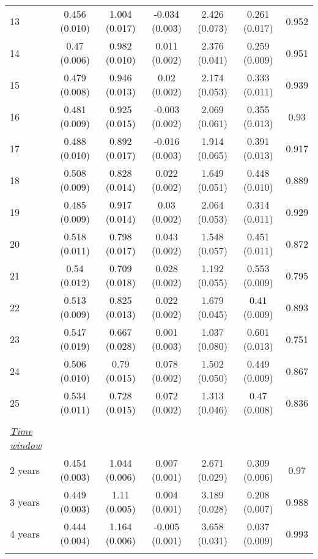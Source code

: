 \begin{tabular}{@{\extracolsep{5pt}} l cccccc}
13 & 0.456 (0.010) & 1.004 (0.017) & -0.034 (0.003) & 2.426 (0.073) & 0.261 (0.017) & 0.952 \\ 
14 & 0.47 (0.006) & 0.982 (0.010) & 0.011 (0.002) & 2.376 (0.041) & 0.259 (0.009) & 0.951 \\ 
15 & 0.479 (0.008) & 0.946 (0.013) & 0.02 (0.002) & 2.174 (0.053) & 0.333 (0.011) & 0.939 \\ 
16 & 0.481 (0.009) & 0.925 (0.015) & -0.003 (0.002) & 2.069 (0.061) & 0.355 (0.013) & 0.93 \\ 
17 & 0.488 (0.010) & 0.892 (0.017) & -0.016 (0.003) & 1.914 (0.065) & 0.391 (0.013) & 0.917 \\ 
18 & 0.508 (0.009) & 0.828 (0.014) & 0.022 (0.002) & 1.649 (0.051) & 0.448 (0.010) & 0.889 \\ 
19 & 0.485 (0.009) & 0.917 (0.014) & 0.03 (0.002) & 2.064 (0.053) & 0.314 (0.011) & 0.929 \\ 
20 & 0.518 (0.011) & 0.798 (0.017) & 0.043 (0.002) & 1.548 (0.057) & 0.451 (0.011) & 0.872 \\ 
21 & 0.54 (0.012) & 0.709 (0.018) & 0.028 (0.002) & 1.192 (0.055) & 0.553 (0.009) & 0.795 \\ 
22 & 0.513 (0.009) & 0.825 (0.013) & 0.022 (0.002) & 1.679 (0.045) & 0.41 (0.009) & 0.893 \\ 
23 & 0.547 (0.019) & 0.667 (0.028) & 0.001 (0.003) & 1.037 (0.080) & 0.601 (0.013) & 0.751 \\ 
24 & 0.506 (0.010) & 0.79 (0.015) & 0.078 (0.002) & 1.502 (0.050) & 0.449 (0.009) & 0.867 \\ 
25 & 0.534 (0.011) & 0.728 (0.015) & 0.072 (0.002) & 1.313 (0.046) & 0.47 (0.008) & 0.836 \\ 
 &   &   &   &   &   &  \\ 
\underline{{\it Time window}} &   &   &   &   &   &  \\ 
2 years & 0.454 (0.003) & 1.044 (0.006) & 0.007 (0.001) & 2.671 (0.029) & 0.309 (0.006) & 0.97 \\ 
3 years & 0.449 (0.003) & 1.11 (0.005) & 0.004 (0.001) & 3.189 (0.028) & 0.208 (0.007) & 0.988 \\ 
4 years & 0.444 (0.004) & 1.164 (0.006) & -0.005 (0.001) & 3.658 (0.031) & 0.037 (0.009) & 0.993 \\ 
\hline \\[-1.8ex] 
\end{tabular} 
